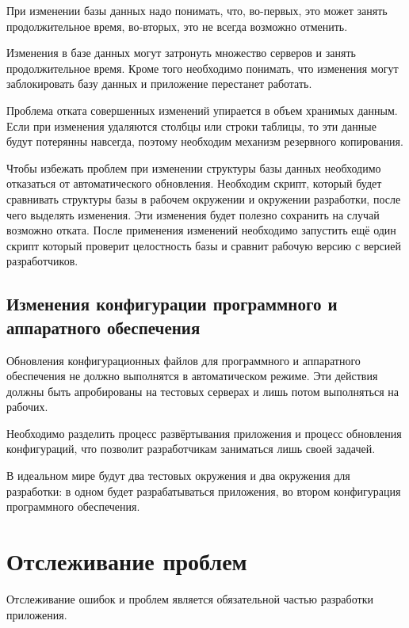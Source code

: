 При изменении базы данных надо понимать, что, во-первых, это может занять продолжительное время, во-вторых, это не всегда возможно отменить.

Изменения в базе данных могут затронуть множество серверов и занять продолжительное время. Кроме того необходимо понимать, что изменения могут заблокировать базу данных и приложение перестанет работать.

Проблема отката совершенных изменений упирается в объем хранимых данным. Если при изменения удаляются столбцы или строки таблицы, то эти данные будут потерянны навсегда, поэтому необходим механизм резервного копирования.

Чтобы избежать проблем при изменении структуры базы данных необходимо отказаться от автоматического обновления. Необходим скрипт, который будет сравнивать структуры базы в рабочем окружении и окружении разработки, после чего выделять изменения. Эти изменения будет полезно сохранить на случай возможно отката.  После применения изменений необходимо запустить ещё один скрипт который проверит целостность базы и сравнит рабочую версию с версией разработчиков.


\subsection{ Изменения конфигурации программного и аппаратного обеспечения } \label{sect3_13_2}

Обновления конфигурационных файлов для программного и аппаратного обеспечения не должно выполнятся в автоматическом режиме. Эти действия должны быть апробированы на тестовых серверах и лишь потом выполняться на рабочих.

Необходимо разделить процесс развёртывания приложения и процесс обновления конфигураций, что позволит разработчикам заниматься лишь своей задачей.

В идеальном мире будут два тестовых окружения и два окружения для разработки: в одном будет разрабатываться приложения, во втором конфигурация программного обеспечения.

\section{ Отслеживание проблем } \label{sect3_14}

Отслеживание ошибок и проблем является обязательной частью разработки приложения.


